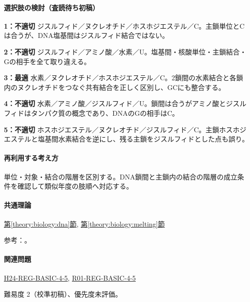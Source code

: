 \paragraph{選択肢の検討（査読待ち初稿）}\mbox{}\par

\noindent\textbf{1：不適切} ジスルフィド／ヌクレオチド／ホスホジエステル／C。主鎖単位とCは合うが、DNA塩基間はジスルフィド結合ではない。\par

\noindent\textbf{2：不適切} ジスルフィド／アミノ酸／水素／U。塩基間・核酸単位・主鎖結合・Gの相手を全て取り違える。\par

\noindent\textbf{3：最適} 水素／ヌクレオチド／ホスホジエステル／C。2鎖間の水素結合と各鎖内のヌクレオチドをつなぐ共有結合を正しく区別し、GCにも整合する。\par

\noindent\textbf{4：不適切} 水素／アミノ酸／ジスルフィド／U。鎖間は合うがアミノ酸とジスルフィドはタンパク質の概念であり、DNAのGの相手はC。\par

\noindent\textbf{5：不適切} ホスホジエステル／ヌクレオチド／ジスルフィド／C。主鎖ホスホジエステルと塩基間水素結合を逆にし、残る主鎖をジスルフィドとした点も誤り。\par

\paragraph{再利用する考え方} 単位・対象・結合の階層を区別する。DNA鎖間と主鎖内の結合の階層の成立条件を確認して類似年度の肢順へ対応する。

\paragraph{共通理論} \hyperref[theory:biology:dna]{第\ref*{theory:biology:dna}節}, \hyperref[theory:biology:melting]{第\ref*{theory:biology:melting}節}

\par 参考：\cite{bu_dna_melting,nhgri_dna}。

\paragraph{関連問題} \hyperref[q:h24-reg-basic-4-5]{H24-REG-BASIC-4-5}, \hyperref[q:r01-reg-basic-4-5]{R01-REG-BASIC-4-5}

\par 難易度 2（校準初稿）、優先度未評価。

